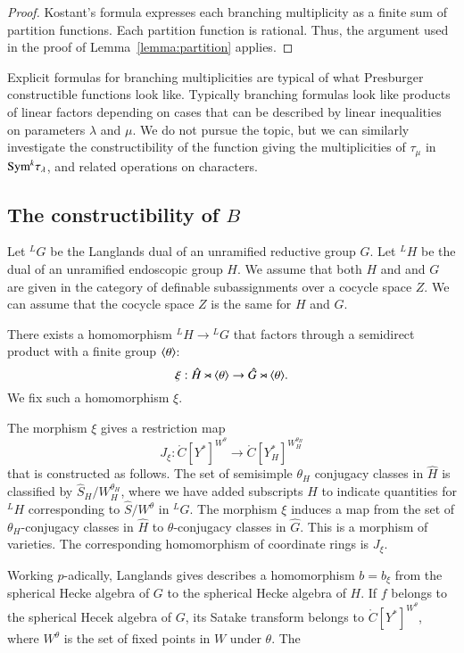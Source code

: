 \begin{proof}  Kostant's formula expresses each branching multiplicity as a finite sum of partition
functions.  Each partition function is rational.  
Thus, the argument used in the proof of Lemma~\ref{lemma:partition} applies.
\end{proof}

Explicit formulas for branching multiplicities are typical of what Presburger constructible functions look like.
Typically branching formulas look like products of linear factors depending on cases that can be
described by linear inequalities on parameters $\lambda$ and $\mu$.
We do not pursue the topic, but we can similarly investigate the constructibility of the function giving the
multiplicities of $\tau_\mu$ in ${\operatorname{Sym}}^k \tau_\lambda$, and related operations on characters.

\subsection{The constructibility of $B$}\label{sec:B}

Let ${}^LG$ be the Langlands dual of an unramified reductive group $G$.  Let ${}^LH$ be the dual of an
unramified endoscopic group $H$.  We assume that both $H$ and and $G$ are given in the category of definable subassignments
over a cocycle space $Z$.  We can assume that the cocycle space $Z$ is the same for $H$ and $G$.

There exists a homomorphism ${}^LH\to {}^LG$ that factors through a semidirect product with a finite group $\langle{\theta}\rangle$:
\[
\xi:\hat H \rtimes \langle{\theta}\rangle \to \hat G \rtimes \langle{\theta}\rangle.
\]
We fix such a homomorphism $\xi$.  

The morphism $\xi$ gives a restriction map
\begin{equation}
J_\xi:\ring{C}[Y^*]^{W^\theta} \to \ring{C}[Y^*_H]^{W_H^{\theta_H}}
\end{equation}
that is constructed as follows.  The set of semisimple $\theta_H$ conjugacy classes in 
$\hat H$ is classified by $\hat S_H/W_H^{\theta_H}$, where we have added subscripts $H$ to
indicate quantities for ${}^LH$ corresponding to $\hat S/W^\theta$ in ${}^LG$.
The morphism $\xi$ induces a map from the set of  $\theta_H$-conjugacy classes in $\hat H$
to $\theta$-conjugacy classes in $\hat G$.  This is a morphism of varieties. The corresponding
homomorphism of coordinate rings is $J_\xi$.


Working $p$-adically, Langlands gives describes a homomorphism $b = b_\xi$
from the spherical Hecke algebra of $G$ to the spherical Hecke algebra of $H$.
If $f$ belongs to the spherical Hecek algebra of $G$, its Satake transform belongs
to $\ring{C}[Y^*]^{W^\theta}$, where $W^\theta$ is the set of fixed points in $W$ under $\theta$.
The 



